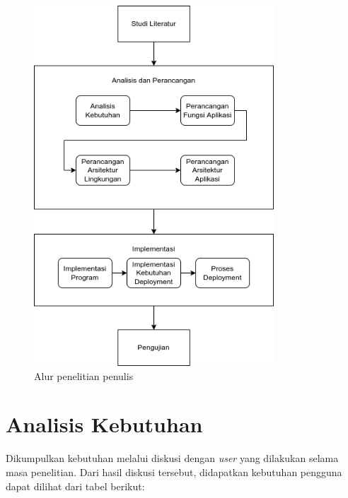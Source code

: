 \begin{figure}
	\centering
	\includegraphics[width=0.8\textwidth]{pics/MetodePenelitian.png}
	\caption{Alur penelitian penulis}
	\label{fig:alur-penelitian}
\end{figure}

\section{Analisis Kebutuhan}
\label{sec:analisisKebutuhan}
Dikumpulkan kebutuhan melalui diskusi dengan \textit{user} yang dilakukan selama masa penelitian. Dari hasil diskusi tersebut, didapatkan kebutuhan pengguna dapat dilihat dari tabel berikut:

